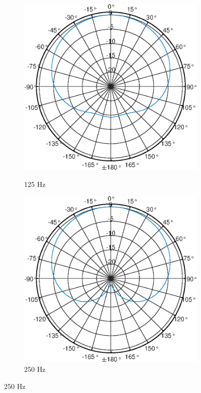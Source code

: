 \begin{figure}[bth]
    \centering
    \begin{subfigure}{.25\textwidth}
        \centering
        \caption{125 Hz}
        \includegraphics[width=\linewidth]{Figures/KM184_125Hz}
        \label{fig:Polar_125}
    \end{subfigure}%
    \begin{subfigure}{.25\textwidth}
        \centering
        \caption{250 Hz}
        \includegraphics[width=\linewidth]{Figures/KM184_250Hz}

\end{subfigure}
\end{figure}
